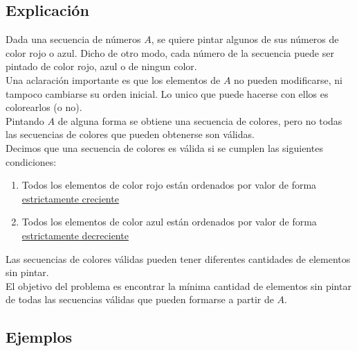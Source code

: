 \subsection{Explicación}

Dada una secuencia de números $A$, se quiere pintar algunos de sus números de color rojo o azul. Dicho de otro modo, cada número de la secuencia puede ser pintado de color rojo, azul o de ningun color. \\

Una aclaración importante es que los elementos de $A$ no pueden modificarse, ni tampoco cambiarse su orden inicial. Lo unico que puede hacerse con ellos es colorearlos (o no).\\

Pintando $A$ de alguna forma se obtiene una secuencia de colores, pero no todas las secuencias de colores que pueden obtenerse son válidas.\\

Decimos que una secuencia de colores es válida si se cumplen las siguientes condiciones:
\begin{enumerate}
\item Todos los elementos de color \textcolor{rojo}{rojo} están ordenados por valor de forma \underline{estrictamente creciente}
\item Todos los elementos de color \textcolor{azul}{azul} están ordenados por valor de forma \underline{estrictamente decreciente}
\end{enumerate}

Las secuencias de colores válidas pueden tener diferentes cantidades de elementos sin pintar. \\
El objetivo del problema es encontrar la mínima cantidad de elementos sin pintar de todas las secuencias válidas que pueden formarse a partir de $A$. \\



\subsection{Ejemplos}

